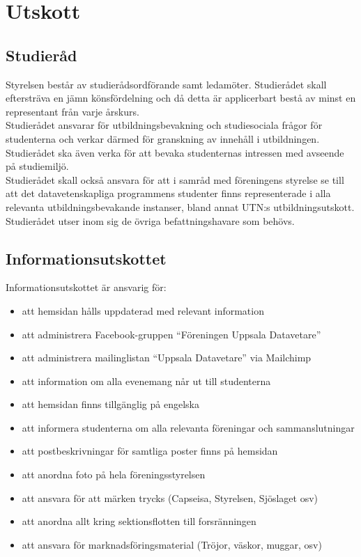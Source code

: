\documentclass[a4paper]{article}
\begin{document}
\section{Utskott}
{\subsection{Studieråd}
  Styrelsen består av studierådsordförande samt ledamöter. Studierådet skall eftersträva en jämn könsfördelning och då detta är applicerbart bestå av minst en representant från varje årskurs.\\
  Studierådet ansvarar för utbildningsbevakning och studiesociala frågor för studenterna och verkar därmed för granskning av innehåll i utbildningen. Studierådet ska även verka för att bevaka studenternas intressen med avseende på studiemiljö.\\
  Studierådet skall också ansvara för att i samråd med föreningens styrelse se till att det datavetenskapliga programmens studenter finns representerade i alla relevanta utbildningsbevakande instanser, bland annat UTN:s utbildningsutskott.\\
  Studierådet utser inom sig de övriga befattningshavare som behövs.
  
  \subsection{Informationsutskottet}
  Informationsutskottet är ansvarig för:
  \begin{itemize}
    \item att hemsidan hålls uppdaterad med relevant information
    \item att administrera Facebook-gruppen “Föreningen Uppsala Datavetare”
    \item att administrera mailinglistan “Uppsala Datavetare” via Mailchimp
    \item att information om alla evenemang når ut till studenterna
    \item att hemsidan finns tillgänglig på engelska
    \item att informera studenterna om alla relevanta föreningar och sammanslutningar
    \item att postbeskrivningar för samtliga poster finns på hemsidan
    \item att anordna foto på hela föreningsstyrelsen
    \item att ansvara för att märken trycks (Capseisa, Styrelsen, Sjöslaget osv)
    \item att anordna allt kring sektionsflotten till forsränningen
    \item att ansvara för marknadsföringsmaterial (Tröjor, väskor, muggar, osv)
  \end{itemize}
  
}
\end{document}
